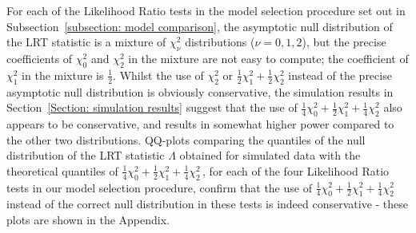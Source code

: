 \documentclass[11pt]{article}
\begin{document}
For each of the Likelihood Ratio tests in the model selection procedure set out in Subsection~\ref{subsection: model comparison}, the asymptotic null distribution of the LRT statistic is a mixture of $\chi^2_{\nu}$ distributions ($\nu =0,1,2$), but the precise coefficients of $\chi^2_0$ and $\chi^2_2$ in the mixture are not easy to compute; the coefficient of $\chi^2_1$ in the mixture is $\frac{1}{2}$. Whilst the use of $\chi^2_2$ or $\frac{1}{2} \chi^2_1 +\frac{1}{2} \chi^2_2$ instead of the precise asymptotic null distribution is obviously conservative, the simulation results in Section~\ref{Section: simulation results} suggest that the use of $\frac{1}{4} \chi^2_0 +\frac{1}{2} \chi^2_1 +\frac{1}{4} \chi^2_2$ also appears to be conservative, and results in somewhat higher power compared to the other two distributions. 
{\color{red} QQ-plots comparing the quantiles of the null distribution of the LRT statistic $\Lambda$ obtained for simulated data
with the theoretical quantiles of $\frac{1}{4} \chi^2_0 +\frac{1}{2} \chi^2_1 +\frac{1}{4} \chi^2_2$\,, for each of the four Likelihood Ratio tests in our model selection procedure,
confirm 
that the use of $\frac{1}{4} \chi^2_0 +\frac{1}{2} \chi^2_1 +\frac{1}{4} \chi^2_2$ instead of the correct null distribution in these tests is indeed conservative - these plots are shown in the Appendix.} 
\end{document}
